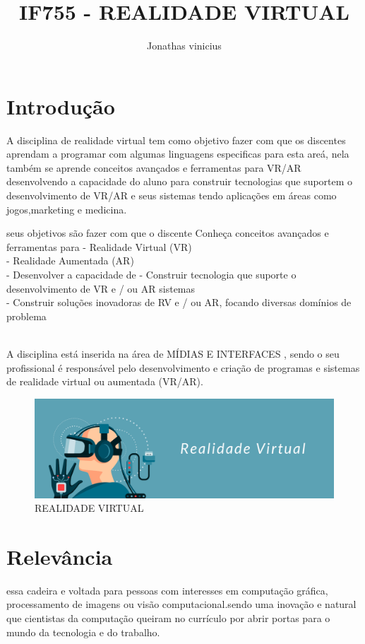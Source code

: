 \documentclass[10pt]{article}
\title{IF755 - REALIDADE VIRTUAL}
\author{Jonathas vinicius }
\date{\vspace{-5ex}}
\begin{document}
\maketitle

\section{Introdução}

A disciplina de realidade virtual tem como objetivo fazer com que os discentes aprendam a programar com algumas linguagens especificas para esta areá, nela também se aprende conceitos avançados e ferramentas para VR/AR desenvolvendo a capacidade do aluno para construir tecnologias que suportem o desenvolvimento de VR/AR e seus sistemas tendo aplicações em áreas como jogos,marketing e medicina.


\begin{itemize}
  seus objetivos são fazer com que o discente Conheça conceitos avançados e ferramentas para
- Realidade Virtual (VR)\\
- Realidade Aumentada (AR)\\
- Desenvolver a capacidade de
- Construir tecnologia que suporte o desenvolvimento de VR e / ou AR 
sistemas \\
- Construir soluções inovadoras de RV e / ou AR, focando diversas domínios de problema \\ 
\cite{primeira} \\
\end{itemize}

A disciplina está inserida na área de MÍDIAS E INTERFACES , sendo o seu profissional é responsável pelo desenvolvimento e criação de programas e sistemas de realidade virtual ou aumentada (VR/AR).


\begin{figure}[]
    \centering
    \includegraphics[scale=0.15]{realidadevirtual.png}
    \caption{REALIDADE VIRTUAL \cite{quinta}}
    \label{fig:realidadevirtual}
\end{figure}

\section{Relevância}
essa cadeira e voltada para pessoas com interesses em computação gráfica, processamento de imagens ou visão computacional.sendo uma inovação e natural que cientistas da computação queiram no currículo por abrir portas para o mundo da tecnologia e do trabalho.
\cite{segunda}
\end{document}
